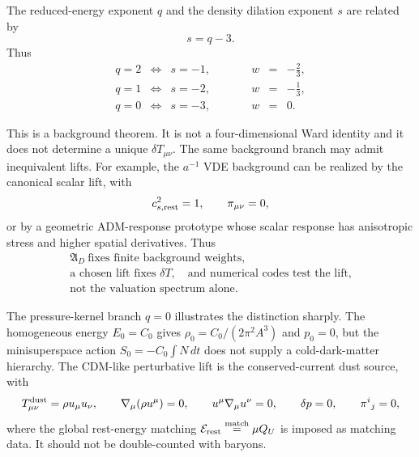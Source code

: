 \documentclass[11pt,a4paper]{article}
\def\dd{d}%
\def\Dil{D}%
\def\QU{Q_U}%
\numberwithin{equation}{section}
\theoremstyle{definition}
\theoremstyle{plain}
\theoremstyle{remark}
\newcommand{\Dil}{\mathscr{D}}
\newcommand{\dd}{\mathrm{d}}
\newcommand{\QU}{Q_U}
\begin{document}
The reduced-energy exponent \(q\) and the density dilation exponent \(s\) are related by
\begin{equation}
\boxed{s=q-3.}
\end{equation}
Thus
\begin{equation}
\begin{array}{rclcrcl}
q=2 &\Longleftrightarrow& s=-1, &\qquad& w&=&-\frac23,\\[1mm]
q=1 &\Longleftrightarrow& s=-2, &\qquad& w&=&-\frac13,\\[1mm]
q=0 &\Longleftrightarrow& s=-3, &\qquad& w&=&0.
\end{array}
\end{equation}

This is a background theorem.  It is not a four-dimensional Ward identity and it does not determine a unique \(\delta T_{\mu\nu}\).  The same background branch may admit inequivalent lifts.  For example, the \(a^{-1}\) VDE background can be realized by the canonical scalar lift, with
\begin{equation}
c_{s,\rm rest}^2=1,
\qquad
\pi_{\mu\nu}=0,
\end{equation}
or by a geometric ADM-response prototype whose scalar response has anisotropic stress and higher spatial derivatives.  Thus
\begin{equation}
\boxed{
\begin{array}{c}
\mathfrak A_{\Dil}\ \text{fixes finite background weights,}\\[1mm]
\text{a chosen lift fixes }\delta T,\quad
\text{and numerical codes test the lift,}\\[1mm]
\text{not the valuation spectrum alone.}
\end{array}}
\end{equation}

The pressure-kernel branch \(q=0\) illustrates the distinction sharply.  The homogeneous energy \(E_0=C_0\) gives \(\rho_0=C_0/(2\pi^2A^3)\) and \(p_0=0\), but the minisuperspace action \(S_0=-C_0\int N\,\dd t\) does not supply a cold-dark-matter hierarchy.  The CDM-like perturbative lift is the conserved-current dust source, with
\begin{equation}
T_{\mu\nu}^{\rm dust}=\rho u_\mu u_\nu,
\qquad
\nabla_\mu(\rho u^\mu)=0,
\qquad
u^\mu\nabla_\mu u^\nu=0,
\qquad
\delta p=0,
\qquad
\pi^i{}_j=0,
\end{equation}
where the global rest-energy matching \(\mathcal E_{\rm rest}\overset{\rm match}{=}\mu\QU\) is imposed as matching data.  It should not be double-counted with baryons.
\end{document}
